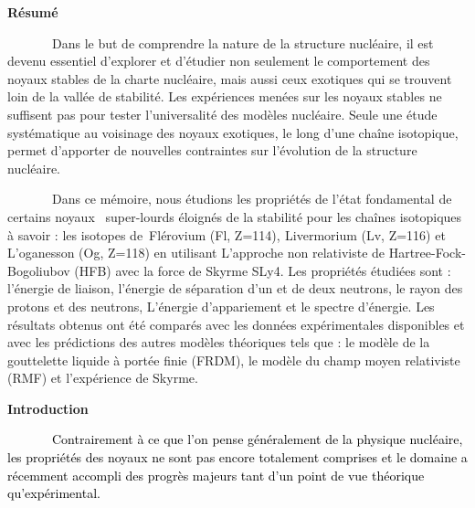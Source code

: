 \documentclass[a4paper]{article}
\title{}
\author{}
\date{}
\begin{document}
\clearpage\setcounter{page}{1}
\bigskip


\bigskip


\bigskip

\textbf{Résumé \ \ \ \ \ \ }


\bigskip

\ \ \ \ \ \ \ Dans le but de comprendre la nature de la structure nucléaire, il est devenu essentiel d’explorer et
d’étudier non seulement le comportement des noyaux stables de la charte nucléaire, mais aussi ceux exotiques qui se
trouvent loin de la vallée de stabilité. Les expériences menées sur les noyaux stables ne suffisent pas pour tester
l’universalité des modèles nucléaire. Seule une étude systématique au voisinage des noyaux exotiques, le long d’une
chaîne isotopique, permet d’apporter de nouvelles contraintes sur l’évolution de la structure nucléaire.

\ \ \ \ \ \ \ Dans ce mémoire, nous étudions les propriétés de l'état fondamental de certains noyaux \ super-lourds
éloignés de la stabilité pour les chaînes isotopiques à savoir : les isotopes
de\textcolor[rgb]{0.1254902,0.12941177,0.13333334}{~Flérovium} (Fl,
Z=114),\textbf{\textcolor[rgb]{0.1254902,0.12941177,0.13333334}{
}}\textcolor[rgb]{0.1254902,0.12941177,0.13333334}{Livermorium }(Lv, Z=116) et L’oganesson (Og, Z=118) en utilisant
L’approche non relativiste de Hartree-Fock-Bogoliubov (HFB) avec la force de Skyrme SLy4. Les propriétés étudiées sont
: l’énergie de liaison, l’énergie de séparation d’un et de deux neutrons, le rayon des protons et des neutrons,
L’énergie d’appariement et le spectre d’énergie. Les résultats obtenus ont été comparés avec les données expérimentales
disponibles et avec les prédictions des autres modèles théoriques tels que : le modèle de la gouttelette liquide à
portée finie (FRDM), le modèle du champ moyen relativiste (RMF) et l’expérience de Skyrme. 


\bigskip


\bigskip


\bigskip


\bigskip


\bigskip


\bigskip


\bigskip


\bigskip

\textbf{Introduction}


\bigskip


\bigskip


\bigskip

\textcolor{black}{\ \ \ \ \ \ \ Contrairement à ce que l'on pense généralement de la physique nucléaire, les propriétés
des noyaux ne sont pas encore totalement comprises et le domaine a récemment accompli des progrès majeurs tant d'un
point de vue théorique qu'expérimental.}
\end{document}
